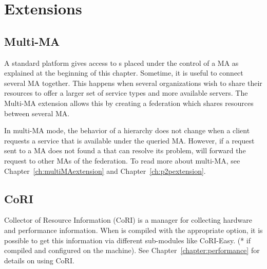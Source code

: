 \section{\diet Extensions}
\label{sec:extensions}

\subsection{Multi-MA}
\label{init:multima}

A standard \diet platform gives access to {\sed}s placed under the control of a
MA as explained at the beginning of this chapter. Sometime, it is useful to
connect several MA together. This happens when several organizations wish to
share their resources to offer a larger set of service types and more available
servers. The Multi-MA extension allows this by creating a federation which
shares resources between several MA.

In multi-MA mode, the behavior of a \diet hierarchy does not change when a
client requests a service that is available under the queried MA. However, if a
request sent to a MA does not found a \sed that can resolve its problem, \diet
will forward the request to other MAs of the federation. To read more about
multi-MA, see Chapter~\ref{ch:multiMAextension} and
Chapter~\ref{ch:p2pextension}.

\subsection{CoRI}
\label{sub:cori}

Collector of Resource Information (CoRI) is a manager for collecting hardware
and performance information.  When \diet is compiled with the appropriate
option, it is possible to get this information via different sub-modules like
 CoRI-Easy. (* if compiled and configured on the \sed machine). See
Chapter~\ref{chapter:performance} for details on using CoRI.




